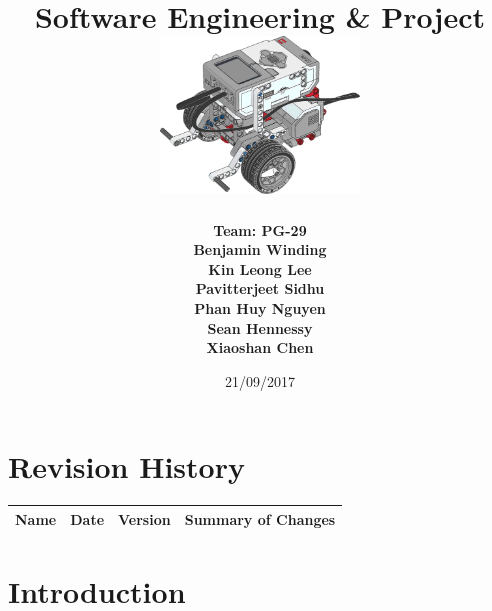 \documentclass[10pt,a4paper,titlepage]{article}
\begin{document}
	
	\begin{titlepage}
		
		\title{
			\fontsize{50}{12}\\
			\vspace{20pt}
			\fontsize{20}{12}\\
			\vspace{10pt}
			\large{Software Engineering \& Project} \\
			\vspace{20pt}
			\includegraphics[width=200px]{title-page-ev3.png}					
		}
		\date{21/09/2017}
		\author{
			\bf{Team: PG-29} \\
			Benjamin Winding \\
			Kin Leong Lee \\
			Pavitterjeet Sidhu \\
			Phan Huy Nguyen \\
			Sean Hennessy \\
			Xiaoshan Chen \\
		}
		\maketitle
		
	\end{titlepage}
		 
	\tableofcontents	
	\listoffigures
	\listoftables
		
	\section*{Revision History}	
	\label{revtable}	
	\begin{tabular}{|p{2.1cm}|p{2.5cm}|p{2cm}|p{4.1cm}|}		
		\hline 
		\textbf {Name} & \textbf{Date} & \textbf {Version} &\textbf {Summary of Changes} \\ 
		\hline 
		\hline 		
	\end{tabular}

	\newpage	
	\section{Introduction}
		
	\newpage
\end{document}

